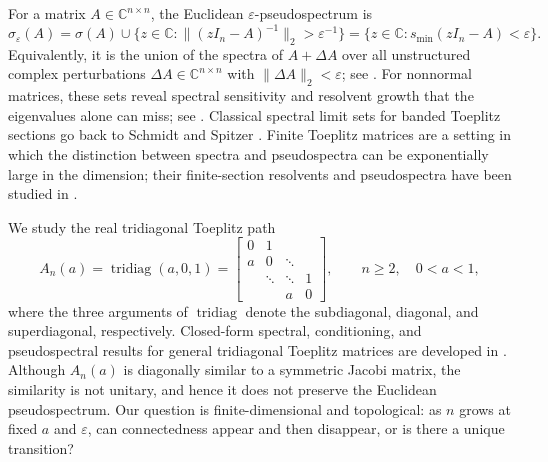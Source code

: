\documentclass[review,hidelinks,onefignum,onetabnum]{siamart251216}
\DeclareMathOperator{\tridiag}{tridiag}
\newcommand{\C}{\mathbb C}
\begin{document}
For a matrix $A\in\C^{n\times n}$, the Euclidean
$\varepsilon$-pseudospectrum is
\begin{equation}\label{eq:intro-pseudospectrum}
 \sigma_\varepsilon(A)
 =\sigma(A)\cup
 \{z\in\C:\lVert(zI_n-A)^{-1}\rVert_2>\varepsilon^{-1}\}
 =\{z\in\C:s_{\min}(zI_n-A)<\varepsilon\}.
\end{equation}
Equivalently, it is the union of the spectra of $A+\Delta A$ over all
unstructured complex perturbations $\Delta A\in\C^{n\times n}$ with
$\lVert\Delta A\rVert_2<\varepsilon$; see
\cite{TrefethenEmbree2005}.  For nonnormal
matrices, these sets reveal spectral sensitivity and resolvent growth
that the eigenvalues alone can miss; see
\cite{Trefethen1997,TrefethenEmbree2005}.  Classical spectral limit sets
for banded Toeplitz sections go back to Schmidt and Spitzer
\cite{SchmidtSpitzer1960}.  Finite Toeplitz matrices are a setting in
which the distinction between spectra and pseudospectra can be
exponentially large in the dimension; their finite-section resolvents
and pseudospectra have been studied in
\cite{BottcherEmbreeTrefethen2002,BottcherGrudsky2005,
BottcherGrudskySilbermann1997,ReichelTrefethen1992}.

We study the real tridiagonal Toeplitz path
\begin{equation}\label{eq:A-matrix}
 A_n(a)=\tridiag(a,0,1)
 =\begin{bmatrix}
 0&1\\
 a&0&\ddots\\
 &\ddots&\ddots&1\\
 &&a&0
 \end{bmatrix},
 \qquad n\geq2,\quad 0<a<1,
\end{equation}
where the three arguments of $\tridiag$ denote the subdiagonal,
diagonal, and superdiagonal, respectively.  Closed-form spectral,
conditioning, and pseudospectral results for general tridiagonal
Toeplitz matrices are developed in
\cite{NoschesePasquiniReichel2013}.  Although $A_n(a)$ is
diagonally similar to a symmetric Jacobi matrix, the similarity is not
unitary, and hence it does not preserve the Euclidean pseudospectrum.
Our question is finite-dimensional and topological: as $n$ grows at
fixed $a$ and $\varepsilon$, can connectedness appear and then disappear, or is
there a unique transition?
\end{document}
